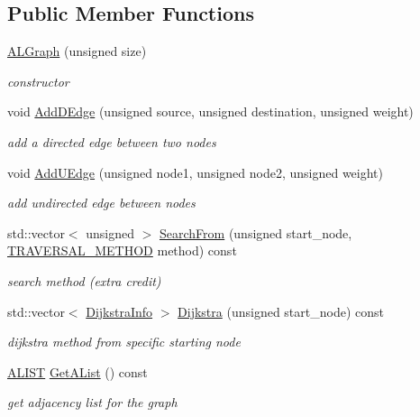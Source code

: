 \subsection*{Public Member Functions}
\begin{DoxyCompactItemize}
\item 
\hyperlink{classALGraph_a1176cab0d831343860c4d647974d0bf4}{A\-L\-Graph} (unsigned size)
\begin{DoxyCompactList}\small\item\em constructor \end{DoxyCompactList}\item 
void \hyperlink{classALGraph_a0f30e56002d326cd7c9eeecd17169d74}{Add\-D\-Edge} (unsigned source, unsigned destination, unsigned weight)
\begin{DoxyCompactList}\small\item\em add a directed edge between two nodes \end{DoxyCompactList}\item 
void \hyperlink{classALGraph_ae9feb4e1f0c550897e511426a82a6dca}{Add\-U\-Edge} (unsigned node1, unsigned node2, unsigned weight)
\begin{DoxyCompactList}\small\item\em add undirected edge between nodes \end{DoxyCompactList}\item 
std\-::vector$<$ unsigned $>$ \hyperlink{classALGraph_af2530fe313efaf095abe815307f5ad84}{Search\-From} (unsigned start\-\_\-node, \hyperlink{classALGraph_a7680b77bf39c4dd40bc75b5b579306b3}{T\-R\-A\-V\-E\-R\-S\-A\-L\-\_\-\-M\-E\-T\-H\-O\-D} method) const 
\begin{DoxyCompactList}\small\item\em search method (extra credit) \end{DoxyCompactList}\item 
std\-::vector$<$ \hyperlink{structDijkstraInfo}{Dijkstra\-Info} $>$ \hyperlink{classALGraph_a99cdf6e2e9f62314ec6494e23c976bec}{Dijkstra} (unsigned start\-\_\-node) const 
\begin{DoxyCompactList}\small\item\em dijkstra method from specific starting node \end{DoxyCompactList}\item 
\hyperlink{ALGraph_8h_a1f16d160191420f6fe90229eabb6c48a}{A\-L\-I\-S\-T} \hyperlink{classALGraph_a875ad536b3dd0825f22440a6631cf836}{Get\-A\-List} () const 
\begin{DoxyCompactList}\small\item\em get adjacency list for the graph \end{DoxyCompactList}\end{DoxyCompactItemize}
